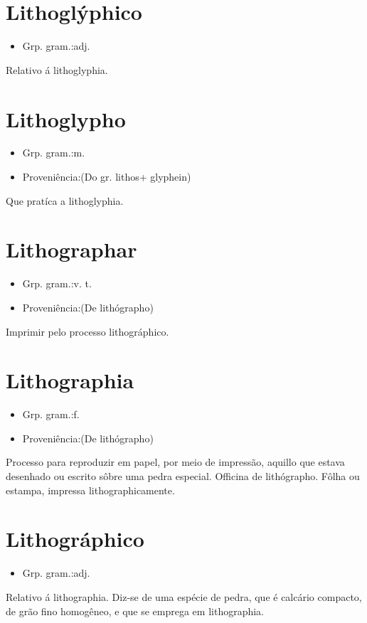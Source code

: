 \section{Lithoglýphico}
\begin{itemize}
\item {Grp. gram.:adj.}
\end{itemize}
Relativo á lithoglyphia.
\section{Lithoglypho}
\begin{itemize}
\item {Grp. gram.:m.}
\end{itemize}
\begin{itemize}
\item {Proveniência:(Do gr. \textunderscore lithos\textunderscore  + \textunderscore glyphein\textunderscore )}
\end{itemize}
Que pratíca a lithoglyphia.
\section{Lithographar}
\begin{itemize}
\item {Grp. gram.:v. t.}
\end{itemize}
\begin{itemize}
\item {Proveniência:(De \textunderscore lithógrapho\textunderscore )}
\end{itemize}
Imprimir pelo processo lithográphico.
\section{Lithographia}
\begin{itemize}
\item {Grp. gram.:f.}
\end{itemize}
\begin{itemize}
\item {Proveniência:(De \textunderscore lithógrapho\textunderscore )}
\end{itemize}
Processo para reproduzir em papel, por meio de impressão, aquillo que estava desenhado ou escrito sôbre uma pedra especial.
Officina de lithógrapho.
Fôlha ou estampa, impressa lithographicamente.
\section{Lithográphico}
\begin{itemize}
\item {Grp. gram.:adj.}
\end{itemize}
Relativo á lithographia.
Diz-se de uma espécie de pedra, que é calcário compacto, de grão fino homogêneo, e que se emprega em lithographia.

